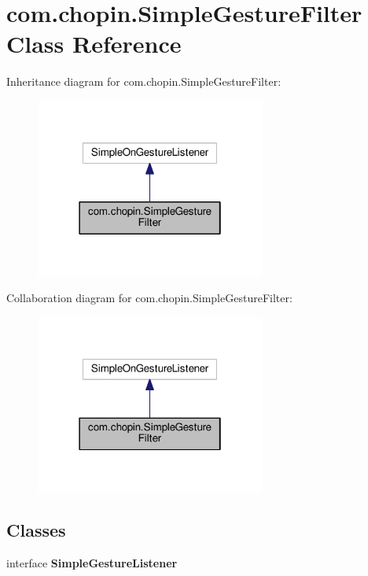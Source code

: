\hypertarget{classcom_1_1chopin_1_1SimpleGestureFilter}{}\section{com.\+chopin.\+Simple\+Gesture\+Filter Class Reference}
\label{classcom_1_1chopin_1_1SimpleGestureFilter}


Inheritance diagram for com.\+chopin.\+Simple\+Gesture\+Filter\+:
\nopagebreak
\begin{figure}[H]
\begin{center}
\leavevmode
\includegraphics[width=214pt]{classcom_1_1chopin_1_1SimpleGestureFilter__inherit__graph}
\end{center}
\end{figure}


Collaboration diagram for com.\+chopin.\+Simple\+Gesture\+Filter\+:
\nopagebreak
\begin{figure}[H]
\begin{center}
\leavevmode
\includegraphics[width=214pt]{classcom_1_1chopin_1_1SimpleGestureFilter__coll__graph}
\end{center}
\end{figure}
\subsection*{Classes}
\begin{DoxyCompactItemize}
\item 
interface {\bfseries Simple\+Gesture\+Listener}
\end{DoxyCompactItemize}
